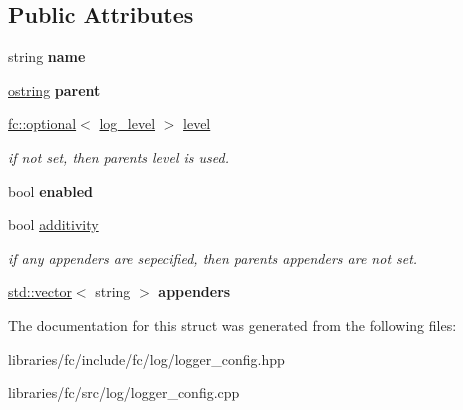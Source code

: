 \subsection*{Public Attributes}
\begin{DoxyCompactItemize}
\item 
\mbox{\label{structfc_1_1logger__config_a2300ca629d573fdfcb81f9031fb1b09d}} 
string {\bfseries name}
\item 
\mbox{\label{structfc_1_1logger__config_a598eeedd1126521aff7776c021d096e4}} 
\mbox{\hyperlink{classfc_1_1optional}{ostring}} {\bfseries parent}
\item 
\mbox{\label{structfc_1_1logger__config_a42e2cd3922ecfb1db67406ff152ee7f2}} 
\mbox{\hyperlink{classfc_1_1optional}{fc\+::optional}}$<$ \mbox{\hyperlink{classfc_1_1log__level}{log\+\_\+level}} $>$ \mbox{\hyperlink{structfc_1_1logger__config_a42e2cd3922ecfb1db67406ff152ee7f2}{level}}
\begin{DoxyCompactList}\small\item\em if not set, then parents level is used. \end{DoxyCompactList}\item 
\mbox{\label{structfc_1_1logger__config_a1279327c0d6062c6d863da1e8b1b0dca}} 
bool {\bfseries enabled}
\item 
\mbox{\label{structfc_1_1logger__config_afb73a18e65093ba8416fe855421ad553}} 
bool \mbox{\hyperlink{structfc_1_1logger__config_afb73a18e65093ba8416fe855421ad553}{additivity}}
\begin{DoxyCompactList}\small\item\em if any appenders are sepecified, then parent\textquotesingle{}s appenders are not set. \end{DoxyCompactList}\item 
\mbox{\label{structfc_1_1logger__config_a7133e5fedacf584ae96416dc5659e8c7}} 
\mbox{\hyperlink{classstd_1_1vector}{std\+::vector}}$<$ string $>$ {\bfseries appenders}
\end{DoxyCompactItemize}


The documentation for this struct was generated from the following files\+:\begin{DoxyCompactItemize}
\item 
libraries/fc/include/fc/log/logger\+\_\+config.\+hpp\item 
libraries/fc/src/log/logger\+\_\+config.\+cpp\end{DoxyCompactItemize}
